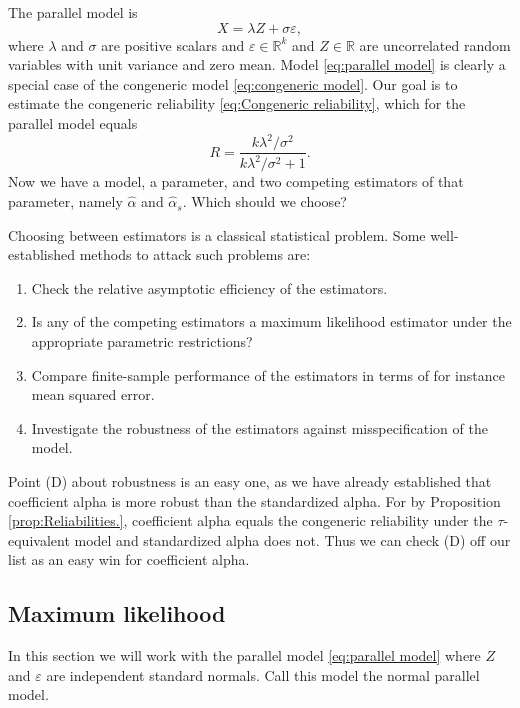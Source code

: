 \documentclass[twoside]{article}
\DeclareMathOperator{\Cor}{Cor}
\renewcommand{\sqrt}[1]{{(#1)^{1/2}}}
\begin{document}
The parallel model is
\begin{equation}
\label{eq:parallel model}
X = \lambda Z + \sigma\varepsilon,
\end{equation}
where $\lambda$ and $\sigma$ are positive scalars and $\varepsilon\in\mathbb{R}^k$ and $Z\in\mathbb{R}$ are uncorrelated random variables with unit variance and zero mean. Model \eqref{eq:parallel model} is clearly a special case of the congeneric model \eqref{eq:congeneric model}. Our goal is to estimate the congeneric reliability \eqref{eq:Congeneric reliability}, which for the parallel model equals
\begin{equation}
\label{eq:parallel_omega}
 R = \frac{k\lambda^2/\sigma^2}{k\lambda^2/\sigma^2 + 1}.
\end{equation}
Now we have a model, a parameter, and two competing estimators of that parameter, namely $\hat{\alpha}$ and $\hat{\alpha}_s$. Which should we choose? 

Choosing between estimators is a classical statistical problem. Some well-established methods to attack such problems are:


\begin{enumerate}[label=(\Alph*)]
\item Check the relative asymptotic efficiency of the estimators.
\item Is any of the competing estimators a maximum likelihood estimator under the appropriate parametric restrictions?
\item Compare finite-sample performance of the estimators in terms of for instance mean squared error.
\item Investigate the robustness of the estimators against misspecification of the model.
\end{enumerate}

Point (D) about robustness is an easy one, as we have already established that coefficient alpha is more robust than the standardized alpha. For by Proposition \ref{prop:Reliabilities.}, coefficient alpha equals the congeneric reliability under the $\tau$-equivalent model and standardized alpha does not. Thus we can check (D) off our list as an easy win for coefficient alpha.

\subsection{Maximum likelihood}
In this section we will work with the parallel model \eqref{eq:parallel model} where $Z$ and $\varepsilon$ are independent standard normals. Call this model the normal parallel model.
\end{document}
